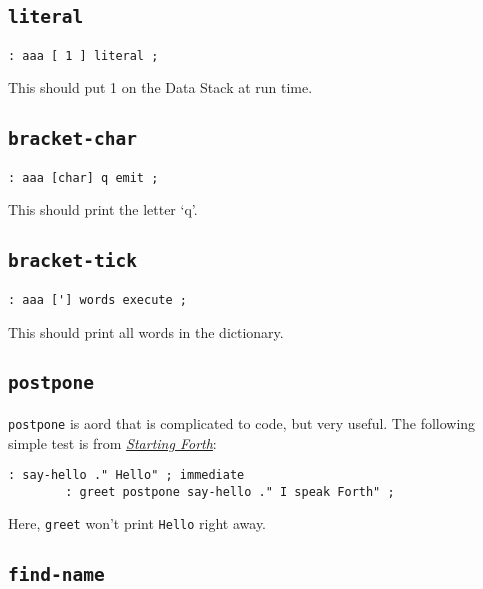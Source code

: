 \subsection{\texttt{literal}}

\begin{lstlisting}[frame=lines]
        : aaa [ 1 ] literal ;
\end{lstlisting}

\noindent This should put 1 on the Data Stack at run time.


\subsection{\texttt{bracket-char}}

\begin{lstlisting}[frame=lines]
        : aaa [char] q emit ;
\end{lstlisting}

\noindent This should print the letter `q'.


\subsection{\texttt{bracket-tick}}

\begin{lstlisting}[frame=lines]
        : aaa ['] words execute ;
\end{lstlisting}

\noindent This should print all words in the dictionary.


\subsection{\texttt{postpone}}

\texttt{postpone} is aord that is complicated to code, but very useful. The
following simple test is from
\href{https://www.forth.com/starting-forth/11-forth-compiler-defining-words/}{\textit{Starting
Forth}}:

\begin{lstlisting}[frame=lines]
        : say-hello ." Hello" ; immediate
        : greet postpone say-hello ." I speak Forth" ;
\end{lstlisting}

\noindent Here, \texttt{greet} won't print \texttt{Hello} right away.


\subsection{\texttt{find-name}}

